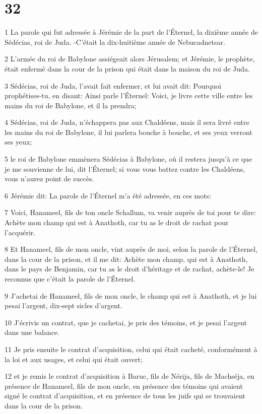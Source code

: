 \chapter{32}

\par 1 La parole qui fut adressée à Jérémie de la part de l'Éternel, la dixième année de Sédécias, roi de Juda. -C'était la dix-huitième année de Nebucadnetsar.
\par 2 L'armée du roi de Babylone assiégeait alors Jérusalem; et Jérémie, le prophète, était enfermé dans la cour de la prison qui était dans la maison du roi de Juda.
\par 3 Sédécias, roi de Juda, l'avait fait enfermer, et lui avait dit: Pourquoi prophétises-tu, en disant: Ainsi parle l'Éternel: Voici, je livre cette ville entre les mains du roi de Babylone, et il la prendra;
\par 4 Sédécias, roi de Juda, n'échappera pas aux Chaldéens, mais il sera livré entre les mains du roi de Babylone, il lui parlera bouche à bouche, et ses yeux verront ses yeux;
\par 5 le roi de Babylone emmènera Sédécias à Babylone, où il restera jusqu'à ce que je me souvienne de lui, dit l'Éternel; si vous vous battez contre les Chaldéens, vous n'aurez point de succès.
\par 6 Jérémie dit: La parole de l'Éternel m'a été adressée, en ces mots:
\par 7 Voici, Hanameel, fils de ton oncle Schallum, va venir auprès de toi pour te dire: Achète mon champ qui est à Anathoth, car tu as le droit de rachat pour l'acquérir.
\par 8 Et Hanameel, fils de mon oncle, vint auprès de moi, selon la parole de l'Éternel, dans la cour de la prison, et il me dit: Achète mon champ, qui est à Anathoth, dans le pays de Benjamin, car tu as le droit d'héritage et de rachat, achète-le! Je reconnus que c'était la parole de l'Éternel.
\par 9 J'achetai de Hanameel, fils de mon oncle, le champ qui est à Anathoth, et je lui pesai l'argent, dix-sept sicles d'argent.
\par 10 J'écrivis un contrat, que je cachetai, je pris des témoins, et je pesai l'argent dans une balance.
\par 11 Je pris ensuite le contrat d'acquisition, celui qui était cacheté, conformément à la loi et aux usages, et celui qui était ouvert;
\par 12 et je remis le contrat d'acquisition à Baruc, fils de Nérija, fils de Machséja, en présence de Hanameel, fils de mon oncle, en présence des témoins qui avaient signé le contrat d'acquisition, et en présence de tous les juifs qui se trouvaient dans la cour de la prison.
